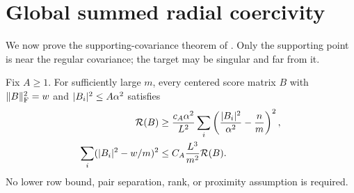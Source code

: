 \section{Global summed radial coercivity}\label{sec:radial}
We now prove the supporting-covariance theorem of \cite{radial}.
Only the supporting point is near the regular covariance; the target
may be singular and far from it.

\begin{theorem}\label{thm:radial}
Fix $A\ge1$. For sufficiently large $m$, every centered score matrix
$B$ with $\lVert B\rVert_{\mathrm F}^2=w$ and $\lvert B_i\rvert^2\le A\alpha^2$ satisfies
\begin{align}
 \mathcal R(B)&\ge\frac{c_A\alpha^2}{L^2}
       \sum_i\left(\frac{\lvert B_i\rvert^2}{\alpha^2}-\frac nm\right)^2,
       \label{eq:radialcoercivity}\\
 \sum_i(\lvert B_i\rvert^2-w/m)^2&\le C_A\frac{L^3}{m^2}\mathcal R(B).
       \label{eq:RC}
\end{align}
No lower row bound, pair separation, rank, or proximity assumption is
required.
\end{theorem}
